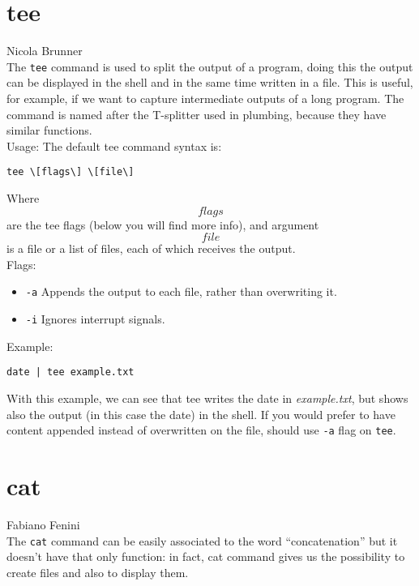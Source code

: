 \documentclass[hidelinks,12pt,a4paper,numbers=enddot]{scrartcl}
\begin{document}
\section{tee}


\large Nicola Brunner \normalsize\\



The \texttt{tee} command is used to split the output of a program, doing
this the output can be displayed in the shell and in the same time written in a
file. This is useful, for example, if we want to capture intermediate outputs of
a long program.
The command is named after the T-splitter used in plumbing, because they have
similar functions.\\

Usage:
The default tee command syntax is:

\begin{verbatim}
tee \[flags\] \[file\]
\end{verbatim}

Where \texttt{\[flags\]} are the tee flags (below you will find more info),
and argument \texttt{\[file\]} is a file or a list of files, each of which
receives the output.\\

Flags:

\begin{itemize}
  \item \texttt{-a} Appends the output to each file, rather than overwriting it.
  \item \texttt{-i} Ignores interrupt signals.
\end{itemize}

Example:

\begin{verbatim}
date | tee example.txt
\end{verbatim}

With this example, we can see that tee writes the date in
\emph{example.txt}, but shows also the output (in this case the date) in the shell.
If you would prefer to have content appended instead of overwritten on the file,
should use \texttt{-a} flag on \texttt{tee}.

\section{cat}


\large Fabiano Fenini \normalsize\\


The \texttt{cat} command can be easily associated to the word “concatenation” but
it doesn’t have that only function: in fact, cat command gives us the possibility to create
files and also to display them.\\
\end{document}
